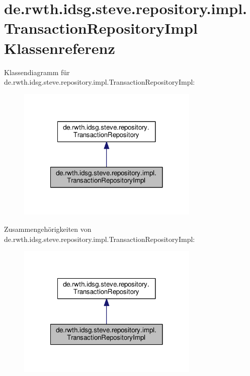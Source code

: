 \hypertarget{classde_1_1rwth_1_1idsg_1_1steve_1_1repository_1_1impl_1_1_transaction_repository_impl}{\section{de.\-rwth.\-idsg.\-steve.\-repository.\-impl.\-Transaction\-Repository\-Impl Klassenreferenz}
\label{classde_1_1rwth_1_1idsg_1_1steve_1_1repository_1_1impl_1_1_transaction_repository_impl}
}


Klassendiagramm für de.\-rwth.\-idsg.\-steve.\-repository.\-impl.\-Transaction\-Repository\-Impl\-:\nopagebreak
\begin{figure}[H]
\begin{center}
\leavevmode
\includegraphics[width=246pt]{classde_1_1rwth_1_1idsg_1_1steve_1_1repository_1_1impl_1_1_transaction_repository_impl__inherit__graph}
\end{center}
\end{figure}


Zusammengehörigkeiten von de.\-rwth.\-idsg.\-steve.\-repository.\-impl.\-Transaction\-Repository\-Impl\-:\nopagebreak
\begin{figure}[H]
\begin{center}
\leavevmode
\includegraphics[width=246pt]{classde_1_1rwth_1_1idsg_1_1steve_1_1repository_1_1impl_1_1_transaction_repository_impl__coll__graph}
\end{center}
\end{figure}
